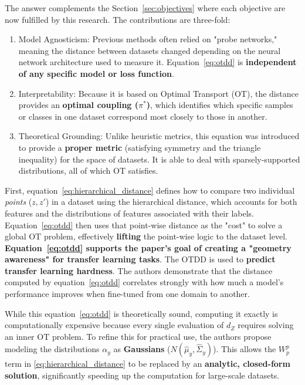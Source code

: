 \documentclass[11pt, a4paper]{article}
\theoremstyle{plain} %
\theoremstyle{definition} %
\begin{document}
			The answer complements the Section~\ref{sec:objectives} where each objective are now fulfilled by this research. The contributions are three-fold:
			\begin{enumerate}
				\item Model Agnosticism: Previous methods often relied on "probe networks," meaning the distance between datasets changed depending on the neural network architecture used to measure it. Equation~\ref{eq:otdd} is \textbf{independent of any specific model or loss function}.
				\item Interpretability: Because it is based on Optimal Transport (OT), the distance provides an \textbf{optimal coupling ($\pi^*$)}, which identifies which specific samples or classes in one dataset correspond most closely to those in another.
				\item Theoretical Grounding: Unlike heuristic metrics, this equation was introduced to provide a \textbf{proper metric} (satisfying symmetry and the triangle inequality) for the space of datasets. It is able to deal with sparsely-supported distributions, all of which OT satisfies.
			\end{enumerate}

			First, equation~\ref{eq:hierarchical_distance} defines how to compare two individual \textit{points} ($z, z'$) in a dataset using the hierarchical distance, which accounts for both features and the distributions of features associated with their labels. Equation~\ref{eq:otdd} then uses that point-wise distance as the "cost" to solve a global OT problem, effectively \textbf{lifting} the point-wise logic to the dataset level. \textbf{Equation~\ref{eq:otdd} supports the paper's goal of creating a "geometry awareness" for transfer learning tasks}. The OTDD is used to \textbf{predict transfer learning hardness}. The authors demonstrate that the distance computed by equation~\ref{eq:otdd} correlates strongly with how much a model's performance improves when fine-tuned from one domain to another.

			While this equation~\ref{eq:otdd} is theoretically sound, computing it exactly is computationally expensive because every single evaluation of $d_Z$ requires solving an inner OT problem. To refine this for practical use, the authors propose modeling the distributions $\alpha_y$ as \textbf{Gaussians} ($N(\hat{\mu}_y, \hat{\Sigma}_y)$). This allows the $W_p^p$ term in \cref{eq:hierarchical_distance} to be replaced by an \textbf{analytic, closed-form solution}, significantly speeding up the computation for large-scale datasets.
\end{document}
